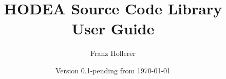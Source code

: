 \documentclass[a4paper]{report}
\begin{document}
\title{HODEA Source Code Library\\
User Guide}
\author{Franz Hollerer}
\date{Version 0.1-pending from \today}

\maketitle

\setcounter{page}{2}

\begin{versionhistory}
\end{versionhistory}

\tableofcontents

\end{document}
